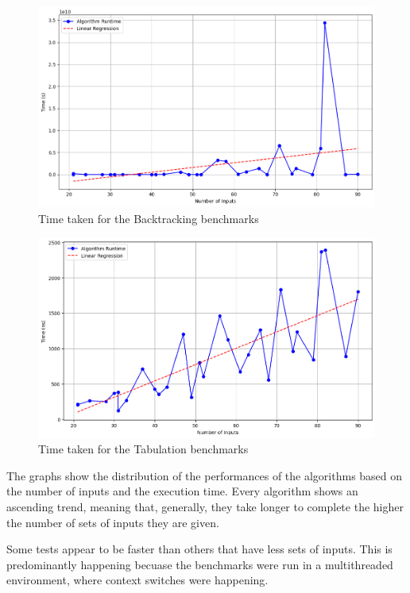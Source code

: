 \documentclass{llncs}
\begin{document}
\begin{figure}[htpb]
    \centering
    \includegraphics[width=\textwidth]{img/backtracking.png}
    \caption{Time taken for the Backtracking benchmarks}
    \label{fig:backtracking}
\end{figure}

\begin{figure}[htpb]
    \centering
    \includegraphics[width=\textwidth]{img/tabulation.png}
    \caption{Time taken for the Tabulation benchmarks}
    \label{fig:tabulation}
\end{figure}

The graphs show the distribution of the performances of the algorithms
based on the number of inputs and the execution time. Every algorithm shows
an ascending trend, meaning that, generally, they take longer to complete
the higher the number of sets of inputs they are given.

Some tests appear to be faster than others that have less sets of inputs.
This is predominantly happening becuase the benchmarks were run in a multithreaded
environment, where context switches were happening.
\end{document}
